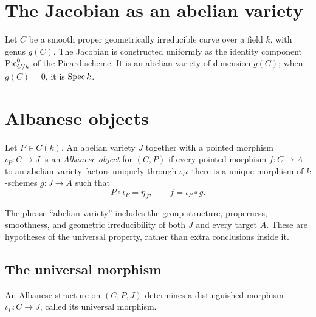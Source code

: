 \section{The Jacobian as an abelian variety}
\label{mk-chap:Jacobian}

Let \(C\) be a smooth proper geometrically irreducible curve over a field
\(k\), with genus \(g(C)\).  The Jacobian is constructed uniformly as the
identity component \(\operatorname{Pic}^0_{C/k}\) of the Picard scheme.  It is an abelian
variety of dimension \(g(C)\); when \(g(C)=0\), it is \(\operatorname{Spec} k\).

\section{Albanese objects}

\begin{definition}\label{mk-def:IsAlbanese}
  \leanok

  Let \(P \in C(k)\).  An abelian variety \(J\) together with a pointed
  morphism \(\iota_P \colon C \to J\) is an \emph{Albanese object} for
  \((C,P)\) if every pointed morphism \(f \colon C \to A\) to an abelian
  variety factors uniquely through \(\iota_P\): there is a unique morphism of
  \(k\)-schemes \(g \colon J \to A\) such that
  \[
    P \circ \iota_P = \eta_J,
    \qquad
    f = \iota_P \circ g.
  \]
\end{definition}

\begin{remark}
  \label{mk-rem:IsAlbanese_typeclasses}
  The phrase ``abelian variety'' includes the group structure, properness,
  smoothness, and geometric irreducibility of both \(J\) and every target
  \(A\).  These are hypotheses of the universal property, rather than extra
  conclusions inside it.
\end{remark}

\subsection{The universal morphism}

\begin{definition}\label{mk-def:IsAlbanese_ofCurve}
  \leanok

  An Albanese structure on \((C,P,J)\) determines a distinguished morphism
  \(\iota_P \colon C \to J\), called its universal morphism.
\end{definition}

